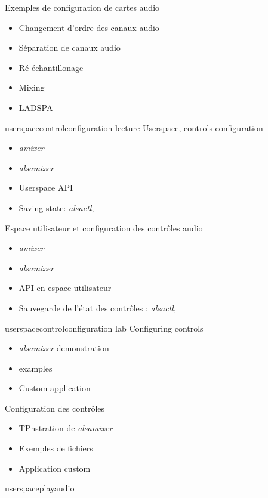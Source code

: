 {Exemples de configuration de cartes audio}
{
  \begin{itemize}
  \item Changement d'ordre des canaux audio
  \item Séparation de canaux audio
  \item Ré-échantillonage
  \item Mixing
  \item LADSPA
  \end{itemize}
  \vspace{0.5em}
}
{userspacecontrolconfiguration}
{lecture}
{Userspace, controls configuration}
{
  \begin{itemize}
  \item {\em amixer}
  \item {\em alsamixer}
  \item Userspace API
  \item Saving state: {\em alsactl}, 
  \end{itemize}
  \vspace{0.5em}
}
{Espace utilisateur et configuration des contrôles audio}
{
  \begin{itemize}
  \item {\em amixer}
  \item {\em alsamixer}
  \item API en espace utilisateur
  \item Sauvegarde de l'état des contrôles : {\em alsactl}, 
  \end{itemize}
  \vspace{0.5em}
}
{userspacecontrolconfiguration}
{lab}
{Configuring controls}
{
  \begin{itemize}
  \item {\em alsamixer} demonstration
  \item {} examples
  \item Custom application
  \end{itemize}
  \vspace{0.5em}
}
{Configuration des contrôles}
{
  \begin{itemize}
  \item TPnstration de {\em alsamixer}
  \item Exemples de fichiers 
  \item Application custom
  \end{itemize}
  \vspace{0.5em}
}
{userspaceplayaudio}
